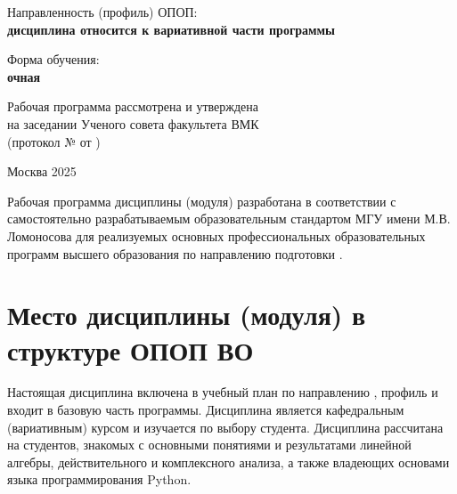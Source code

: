 \documentclass[a4paper, 12pt]{article}
\begin{document}
\begin{titlepage}
    \vspace{16pt}

    Направленность (профиль) ОПОП:\\
    \textbf{дисциплина относится к вариативной части программы }

    \vspace{16pt}

    Форма обучения:\\
    \textbf{очная}

    \vspace{48pt}

    \begin{flushright}

        Рабочая программа рассмотрена и утверждена\\
        на заседании  Ученого совета факультета ВМК\\
        (протокол №\underline{\hspace{0.5cm}} от \underline{\hspace{3cm}})

    \end{flushright}

\vspace*{\fill}

Москва 2025

\end{titlepage}

Рабочая программа дисциплины (модуля) разработана в соответствии с самостоятельно разрабатываемым образовательным стандартом МГУ имени М.В. Ломоносова для реализуемых основных профессиональных образовательных программ высшего образования по направлению подготовки .

\newpage \tableofcontents

\newpage

\section{Место дисциплины (модуля) в структуре ОПОП ВО}

Настоящая дисциплина включена в учебный план по направлению , профиль  и входит в базовую часть программы.
Дисциплина является кафедральным (вариативным)  курсом и изучается по выбору студента.
Дисциплина рассчитана на студентов, знакомых с основными понятиями и результатами линейной алгебры, действительного и комплексного анализа, а также владеющих основами языка программирования Python.
\end{document}
